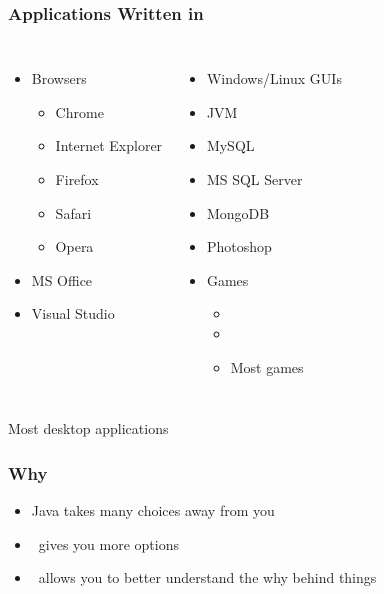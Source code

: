\begin{frame}
  \frametitle{Applications Written in \cpp}
  \begin{columns}
    \column{5cm}
    \begin{itemize}
      \item Browsers
            \begin{itemize}
              \item Chrome
              \item Internet Explorer
              \item Firefox
              \item Safari
              \item Opera
            \end{itemize}
      \item MS Office
      \item Visual Studio
    \end{itemize}
    \column{5cm}
    \begin{itemize}
      \item Windows/Linux GUIs
      \item JVM
      \item MySQL
      \item MS SQL Server
      \item MongoDB
      \item Photoshop
      \item Games
            \begin{itemize}
              \item {}
              \item {}
              \item Most games
            \end{itemize}
    \end{itemize}
  \end{columns}
  \vskip4mm
  \begin{center}
    Most desktop applications
  \end{center}
\end{frame}

\begin{frame}
  \frametitle{Why \cpp}
  \begin{itemize}
    \item Java takes many choices away from you
    \item \cpp\ gives you more options
    \item \cpp\ allows you to better understand the why behind things
  \end{itemize}
\end{frame}

